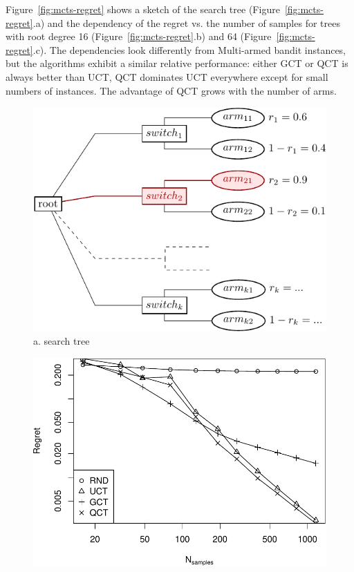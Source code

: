 \documentclass[letterpaper]{article}
\begin{document}
Figure~\ref{fig:mcts-regret} shows a sketch of the search tree
(Figure~\ref{fig:mcts-regret}.a) and the dependency of the regret vs. the
number of samples for trees with root degree 16
(Figure~\ref{fig:mcts-regret}.b) and 64 (Figure~\ref{fig:mcts-regret}.c). The
dependencies look differently from Multi-armed bandit instances, but
the algorithms exhibit a similar relative performance: either GCT or QCT
is always better than UCT, QCT dominates UCT everywhere
except for small numbers of instances. The advantage of QCT grows with
the number of arms.

\begin{figure}[h!]
  \begin{minipage}[c]{1.0\linewidth}
    \centering
    \includegraphics[scale=0.8]{twolevel-tree.pdf}\\
    a. search tree
    \vspace{1em}
  \end{minipage}
  \begin{minipage}[c]{1.0\linewidth}
    \centering
    \includegraphics[scale=0.4]{tree-identity-k=16-uqb=8.pdf}\\ 

\end{minipage}
\end{figure}
\end{document}
